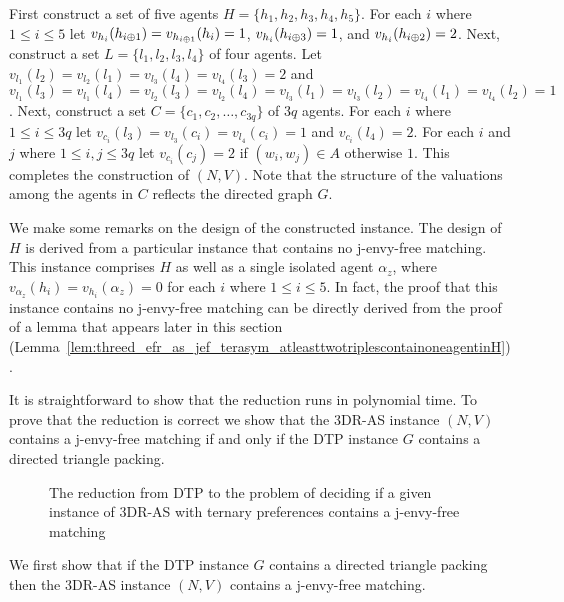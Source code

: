 First construct a set of five agents $H = \{ h_1, h_2, h_3, h_4, h_5 \}$. For each $i$ where $1\leq i \leq 5$ let $v_{h_i}(h_{i \oplus 1}) = v_{h_{i \oplus 1}}(h_i) = 1$, $v_{h_i}(h_{i \oplus 3}) = 1$, and $v_{h_i}(h_{i \oplus 2}) = 2$. Next, construct a set $L = \{ l_1, l_2, l_3, l_4 \}$ of four agents. Let $v_{l_1}(l_2) = v_{l_2}(l_1) = v_{l_3}(l_4) = v_{l_4}(l_3) = 2$ and $v_{l_1}(l_3) = v_{l_1}(l_4) = v_{l_2}(l_3) = v_{l_2}(l_4) = v_{l_3}(l_1) = v_{l_3}(l_2) = v_{l_4}(l_1) = v_{l_4}(l_2) = 1$. Next, construct a set $C = \{ c_1, c_2, \dots, c_{3q} \}$ of $3q$ agents. For each $i$ where $1\leq i \leq 3q$ let $v_{c_i}(l_3) = v_{l_3}(c_i) = v_{l_4}(c_i) = 1$ and $v_{c_i}(l_4) = 2$. For each $i$ and $j$ where $1\leq i, j \leq 3q$ let $v_{c_i}(c_j) = 2$ if $( w_i, w_j ) \in A$ otherwise $1$. This completes the construction of $(N, V)$. Note that the structure of the valuations among the agents in $C$ reflects the directed graph $G$. 

We make some remarks on the design of the constructed instance. The design of $H$ is derived from a particular instance that contains no j-envy-free matching. This instance comprises $H$ as well as a single isolated agent $\alpha_{z}$, where $v_{\alpha_{z}}(h_i) = v_{h_i}(\alpha_{z}) = 0$ for each $i$ where $1\leq i \leq 5$. In fact, the proof that this instance contains no j-envy-free matching can be directly derived from the proof of a lemma that appears later in this section (Lemma~\ref{lem:threed_efr_as_jef_terasym_atleasttwotriplescontainoneagentinH}).

It is straightforward to show that the reduction runs in polynomial time. To prove that the reduction is correct we show that the 3DR-AS instance $(N, V)$ contains a j-envy-free matching if and only if the DTP instance $G$ contains a directed triangle packing.

\begin{figure}
    \centering
    
    \caption{The reduction from DTP to the problem of deciding if a given instance of 3DR-AS with ternary preferences contains a j-envy-free matching}
    \label{fig:threed_efr_as_jef_terasym_reduction}
\end{figure}

We first show that if the DTP instance $G$ contains a directed triangle packing then the 3DR-AS instance $(N, V)$ contains a j-envy-free matching.

